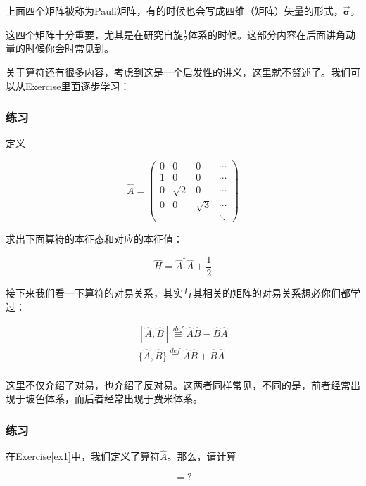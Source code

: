 上面四个矩阵被称为Pauli矩阵，有的时候也会写成四维（矩阵）矢量的形式，$\vec{\bm\sigma}$。


这四个矩阵十分重要，尤其是在研究自旋$\displaystyle\frac{1}{2}$体系的时候。这部分内容在后面讲角动量的时候你会时常见到。

关于算符还有很多内容，考虑到这是一个启发性的讲义，这里就不赘述了。我们可以从Exercise里面逐步学习：

\subsubsection{练习}
定义

\begin{equation}
\hat{A} = \left(
\begin{matrix}
0 & 0 & 0 & \cdots \\
1 & 0 & 0 & \cdots \\
0 & \sqrt{2} & 0 & \cdots\\
0 & 0 & \sqrt{3} & \cdots\\
  &  &  &  \ddots
\end{matrix}
\right)
\end{equation}

求出下面算符的本征态和对应的本征值：

\begin{equation}
\hat{H} = \hat{A}^{\dagger}\hat{A} + \frac{1}{2}
\end{equation}

接下来我们看一下算符的对易关系，其实与其相关的矩阵的对易关系想必你们都学过：

\begin{equation}
\begin{split}
[\hat{A},\hat{B}] \overset{def}{\equiv}\hat{A}\hat{B} - \hat{B}\hat{A}\\
\{\hat{A},\hat{B}\} \overset{def}{\equiv}\hat{A}\hat{B} + \hat{B}\hat{A}\\
\end{split}
\end{equation}

这里不仅介绍了对易，也介绍了反对易。这两者同样常见，不同的是，前者经常出现于玻色体系，而后者经常出现于费米体系。

\subsubsection{练习}
在Exercise{\ref{ex1}}中，我们定义了算符$\hat{A}$。那么，请计算

\begin{equation}
[\hat{A},\hat{A}^{\dagger}] = ?
\end{equation}

